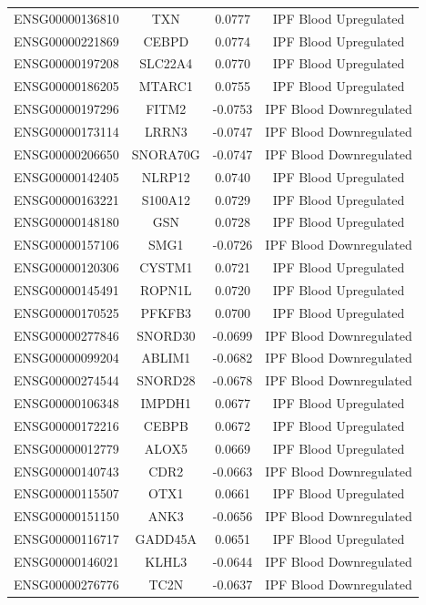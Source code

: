 \documentclass[
]{article}
\begin{document}
\begin{singlespace}
\begin{longtable}[t]{lccc}
ENSG00000136810 & TXN & 0.0777 & IPF Blood Upregulated\\
ENSG00000221869 & CEBPD & 0.0774 & IPF Blood Upregulated\\
ENSG00000197208 & SLC22A4 & 0.0770 & IPF Blood Upregulated\\
ENSG00000186205 & MTARC1 & 0.0755 & IPF Blood Upregulated\\
ENSG00000197296 & FITM2 & -0.0753 & IPF Blood Downregulated\\
\addlinespace
ENSG00000173114 & LRRN3 & -0.0747 & IPF Blood Downregulated\\
ENSG00000206650 & SNORA70G & -0.0747 & IPF Blood Downregulated\\
ENSG00000142405 & NLRP12 & 0.0740 & IPF Blood Upregulated\\
ENSG00000163221 & S100A12 & 0.0729 & IPF Blood Upregulated\\
ENSG00000148180 & GSN & 0.0728 & IPF Blood Upregulated\\
\addlinespace
ENSG00000157106 & SMG1 & -0.0726 & IPF Blood Downregulated\\
ENSG00000120306 & CYSTM1 & 0.0721 & IPF Blood Upregulated\\
ENSG00000145491 & ROPN1L & 0.0720 & IPF Blood Upregulated\\
ENSG00000170525 & PFKFB3 & 0.0700 & IPF Blood Upregulated\\
ENSG00000277846 & SNORD30 & -0.0699 & IPF Blood Downregulated\\
\addlinespace
ENSG00000099204 & ABLIM1 & -0.0682 & IPF Blood Downregulated\\
ENSG00000274544 & SNORD28 & -0.0678 & IPF Blood Downregulated\\
ENSG00000106348 & IMPDH1 & 0.0677 & IPF Blood Upregulated\\
ENSG00000172216 & CEBPB & 0.0672 & IPF Blood Upregulated\\
ENSG00000012779 & ALOX5 & 0.0669 & IPF Blood Upregulated\\
\addlinespace
ENSG00000140743 & CDR2 & -0.0663 & IPF Blood Downregulated\\
ENSG00000115507 & OTX1 & 0.0661 & IPF Blood Upregulated\\
ENSG00000151150 & ANK3 & -0.0656 & IPF Blood Downregulated\\
ENSG00000116717 & GADD45A & 0.0651 & IPF Blood Upregulated\\
ENSG00000146021 & KLHL3 & -0.0644 & IPF Blood Downregulated\\
\addlinespace
ENSG00000276776 & TC2N & -0.0637 & IPF Blood Downregulated\\

\end{longtable}
\end{singlespace}
\end{document}
